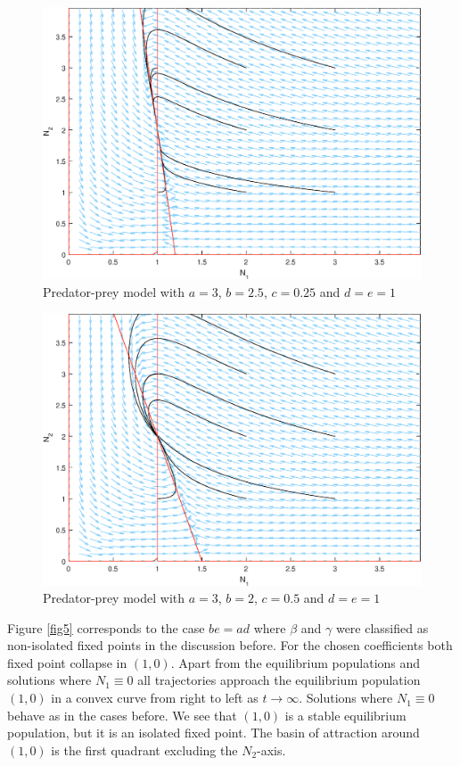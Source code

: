 \documentclass[11pt,a4paper]{scrartcl}
\theoremstyle{definition}
\begin{document}
\begin{figure}[h]
	\centering
	\includegraphics[scale=0.72]{nBeta_StableNode.eps}
	\caption{Predator-prey model with $a=3$, $b=2.5$, $c=0.25$ and $d=e=1$}
	\label{fig3}
\end{figure}

\begin{figure}[h]
	\centering
	\includegraphics[scale=0.72]{nBeta_MarginalCase.eps}
	\caption{Predator-prey model with $a=3$, $b=2$, $c=0.5$ and $d=e=1$}
	\label{fig4}
\end{figure}

Figure \ref{fig5} corresponds to the case $be=ad$ where $\beta$ and $\gamma$ were classified as non-isolated fixed points in the discussion before. For the chosen coefficients both fixed point collapse in $(1,0)$. Apart from the equilibrium populations and solutions where $N_1 \equiv 0$ all trajectories approach the equilibrium population $(1,0)$ in a convex curve from right to left as $t \rightarrow \infty$. Solutions where $N_1 \equiv 0$ behave as in the cases before. We see that $(1,0)$ is a stable equilibrium population, but it is an isolated fixed point. The basin of attraction around $(1,0)$ is the first quadrant excluding the $N_2$-axis.
\end{document}
